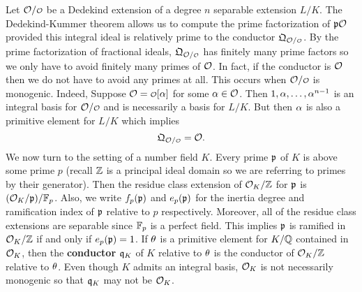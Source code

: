     Let $\mc{O}/\smc{O}$ be a Dedekind extension of a degree $n$ separable extension $L/K$. The Dedekind-Kummer theorem allows us to compute the prime factorization of $\mathfrak{p}\mathcal{O}$ provided this integral ideal is relatively prime to the conductor $\mf{Q}_{\mc{O}/\smc{O}}$. By the prime factorization of fractional ideals, $\mf{Q}_{\mc{O}/\smc{O}}$ has finitely many prime factors so we only have to avoid finitely many primes of $\mathcal{O}$. In fact, if the conductor is $\mathcal{O}$ then we do not have to avoid any primes at all. This occurs when $\mc{O}/\smc{O}$ is monogenic. Indeed, Suppose $\mc{O} = \smc{O}[\a]$ for some $\alpha \in \mathcal{O}$. Then $1,\alpha,\ldots,\alpha^{n-1}$ is an integral basis for $\mc{O}/\smc{O}$ and is necessarily a basis for $L/K$. But then $\alpha$ is also a primitive element for $L/K$ which implies
    \[
      \mf{Q}_{\mc{O}/\smc{O}} = \mc{O}.
    \]
    We now turn to the setting of a number field $K$. Every prime $\mathfrak{p}$ of $K$ is above some prime $p$ (recall $\mathbb{Z}$ is a principal ideal domain so we are referring to primes by their generator). Then the residue class extension of $\mathcal{O}_{K}/\mathbb{Z}$ for $\mathfrak{p}$ is $(\mathcal{O}_{K}/\mathfrak{p})/\mathbb{F}_{p}$. Also, we write $f_{p}(\mathfrak{p})$ and $e_{p}(\mathfrak{p})$ for the inertia degree and ramification index of $\mathfrak{p}$ relative to $p$ respectively. Moreover, all of the residue class extensions are separable since $\mathbb{F}_{p}$ is a perfect field. This implies $\mathfrak{p}$ is ramified in $\mathcal{O}_{K}/\mathbb{Z}$ if and only if $e_{p}(\mathfrak{p}) = 1$. If $\theta$ is a primitive element for $K/\mathbb{Q}$ contained in $\mathcal{O}_{K}$, then the \textbf{conductor} $\mathfrak{q}_{K}$ of $K$ relative to $\theta$ is the conductor of $\mathcal{O}_{K}/\mathbb{Z}$ relative to $\theta$. Even though $K$ admits an integral basis, $\mathcal{O}_{K}$ is not necessarily monogenic so that $\mathfrak{q}_{K}$ may not be $\mathcal{O}_{K}$.

